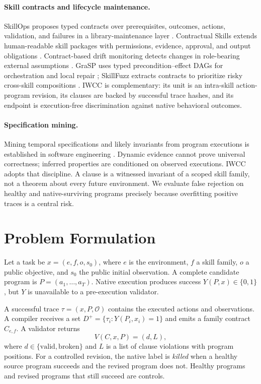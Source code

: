 \documentclass[10pt]{article}
\begin{document}
\paragraph{Skill contracts and lifecycle maintenance.}
SkillOps proposes typed contracts over prerequisites, outcomes, actions, validation, and failures in a library-maintenance layer \citep{pu2026skillops}. Contractual Skills extends human-readable skill packages with permissions, evidence, approval, and output obligations \citep{liu2026contractual}. Contract-based drift monitoring detects changes in role-bearing external assumptions \citep{fan2026drift}. GraSP uses typed precondition--effect DAGs for orchestration and local repair \citep{xia2026grasp}; SkillFuzz extracts contracts to prioritize risky cross-skill compositions \citep{hu2026skillfuzz}. IWCC is complementary: its unit is an intra-skill action-program revision, its clauses are backed by successful trace hashes, and its endpoint is execution-free discrimination against native behavioral outcomes.

\paragraph{Specification mining.}
Mining temporal specifications and likely invariants from program executions is established in software engineering \citep{ammons2002mining,ernst2007daikon,beschastnikh2011synoptic}. Dynamic evidence cannot prove universal correctness; inferred properties are conditioned on observed executions. IWCC adopts that discipline. A clause is a witnessed invariant of a scoped skill family, not a theorem about every future environment. We evaluate false rejection on healthy and native-surviving programs precisely because overfitting positive traces is a central risk.

\section{Problem Formulation}
Let a task be $x=(e,f,o,s_0)$, where $e$ is the environment, $f$ a skill family, $o$ a public objective, and $s_0$ the public initial observation. A complete candidate program is $P=(a_1,\ldots,a_T)$. Native execution produces success $Y(P,x)\in\{0,1\}$, but $Y$ is unavailable to a pre-execution validator.

A successful trace $\tau=(x,P,\mathcal{O})$ contains the executed actions and observations. A compiler receives a set $D^+=\{\tau_i:Y(P_i,x_i)=1\}$ and emits a family contract $C_{e,f}$. A validator returns
\[
V(C,x,P)=(d,L),
\]
where $d\in\{\mathrm{valid},\mathrm{broken}\}$ and $L$ is a list of clause violations with program positions. For a controlled revision, the native label is \emph{killed} when a healthy source program succeeds and the revised program does not. Healthy programs and revised programs that still succeed are controls.
\end{document}
